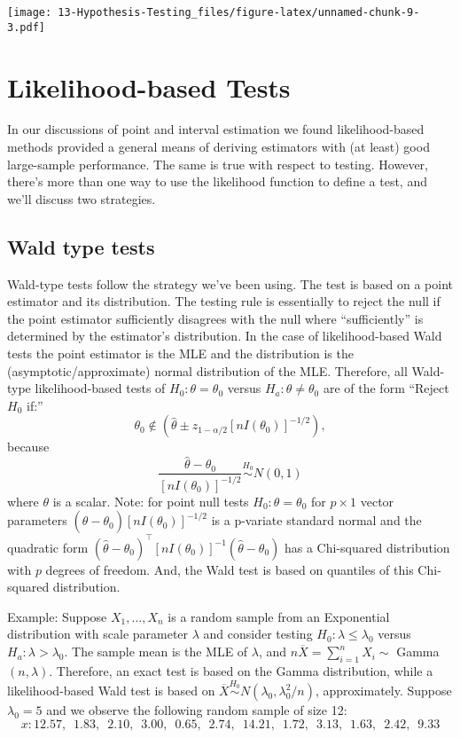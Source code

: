 \documentclass[
]{book}
\begin{document}
\texttt{[image: 13-Hypothesis-Testing\_files/figure-latex/unnamed-chunk-9-3.pdf]}

\hypertarget{likelihood-based-tests}{%
\section{Likelihood-based Tests}\label{likelihood-based-tests}}

In our discussions of point and interval estimation we found likelihood-based methods provided a general means of deriving estimators with (at least) good large-sample performance. The same is true with respect to testing. However, there's more than one way to use the likelihood function to define a test, and we'll discuss two strategies.

\hypertarget{wald-type-tests}{%
\subsection{Wald type tests}\label{wald-type-tests}}

Wald-type tests follow the strategy we've been using. The test is based on a point estimator and its distribution. The testing rule is essentially to reject the null if the point estimator sufficiently disagrees with the null where ``sufficiently'' is determined by the estimator's distribution. In the case of likelihood-based Wald tests the point estimator is the MLE and the distribution is the (asymptotic/approximate) normal distribution of the MLE. Therefore, all Wald-type likelihood-based tests of \(H_0:\theta = \theta_0\) versus \(H_a:\theta\ne \theta_0\) are of the form ``Reject \(H_0\) if:''
\[\theta_0 \notin (\hat\theta \pm z_{1-\alpha/2}[nI(\theta_0)]^{-1/2}),\]
because
\[\frac{\hat\theta - \theta_0}{[nI(\theta_0)]^{-1/2}}\stackrel{H_0}{\sim}N(0,1)\]
where \(\theta\) is a scalar.
Note: for point null tests \(H_0:\theta=\theta_0\) for \(p\times 1\) vector parameters \((\hat\theta-\theta_0)[nI(\theta_0)]^{-1/2}\) is a p-variate standard normal and the quadratic form \((\hat\theta-\theta_0)^{\top}[nI(\theta_0)]^{-1} (\hat\theta-\theta_0)\) has a Chi-squared distribution with \(p\) degrees of freedom. And, the Wald test is based on quantiles of this Chi-squared distribution.

Example: Suppose \(X_1, \ldots, X_n\) is a random sample from an Exponential distribution with scale parameter \(\lambda\) and consider testing \(H_0:\lambda \leq \lambda_0\) versus \(H_a:\lambda > \lambda_0\). The sample mean is the MLE of \(\lambda\), and \(n\overline X= \sum_{i=1}^nX_i \sim\) Gamma\((n, \lambda)\). Therefore, an exact test is based on the Gamma distribution, while a likelihood-based Wald test is based on \(\overline X \stackrel{H_0}{\sim}N(\lambda_0,\lambda_0^2/n)\), approximately. Suppose \(\lambda_0 = 5\) and we observe the following random sample of size 12:
\[x : 12.57,\,\,\,  1.83,\,\,\,  2.10,\,\,\,  3.00,\,\,\,  0.65,\,\,\,  2.74,\,\,\, 14.21,\,\,\,  1.72,\,\,\,  3.13,\,\,\,  1.63,\,\,\,  2.42,\,\,\,  9.33\]
\end{document}

